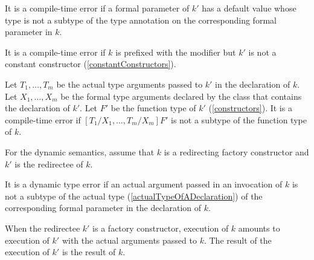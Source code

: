 \documentclass[makeidx]{article}
\begin{document}
\LMHash{}%
It is a compile-time error if a formal parameter of $k'$ has a default value
whose type is not a subtype of the type annotation
on the corresponding formal parameter in $k$.



\LMHash{}%
It is a compile-time error if $k$ is prefixed with the \CONST{} modifier but $k'$ is not a constant constructor (\ref{constantConstructors}).

\LMHash{}%
Let $T_1, \ldots, T_m$ be the actual type arguments passed to $k'$
in the declaration of $k$.
Let $X_1, \ldots, X_m$ be the formal type arguments declared by
the class that contains the declaration of $k'$.
Let $F'$ be the function type of $k'$ (\ref{constructors}).
It is a compile-time error if $[T_1/X_1, \ldots, T_m/X_m]F'$
is not a subtype of the function type of $k$.


\LMHash{}%
For the dynamic semantics,
assume that $k$ is a redirecting factory constructor
and $k'$ is the redirectee of $k$.

\LMHash{}%
It is a dynamic type error if an actual argument passed in an invocation of $k$
is not a subtype of the actual type (\ref{actualTypeOfADeclaration})
of the corresponding formal parameter in the declaration of $k$.

\LMHash{}%
When the redirectee $k'$ is a factory constructor,
execution of $k$ amounts to execution of $k'$ with the actual arguments passed to $k$.
The result of the execution of $k'$ is the result of $k$.
\end{document}
